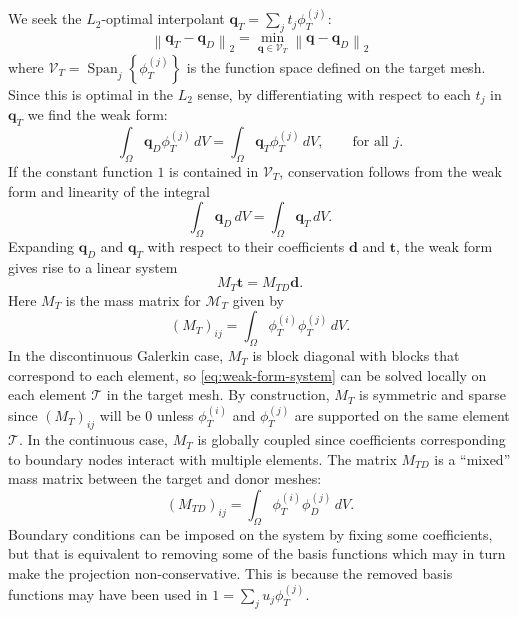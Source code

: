 \documentclass[oneside, reqno]{amsart}
\theoremstyle{definition}
\begin{document}
We seek the \(L_2\)-optimal interpolant \(\bm{q}_T = \sum_j t_j \phi_T^{(j)}\):
\begin{equation}
\left \lVert \bm{q}_T - \bm{q}_D \right \rVert_2 =
\min_{\bm{q} \in \mathcal{V}_T}
\left \lVert \bm{q} - \bm{q}_D \right \rVert_2
\end{equation}
where \(\mathcal{V}_T = \operatorname{Span}_j\left\{\phi_T^{(j)}\right\}\)
is the function space defined on the target mesh. Since this is optimal in
the \(L_2\) sense, by differentiating with respect to each \(t_j\) in
\(\bm{q}_T\) we find the weak form:
\begin{equation}
\int_{\Omega} \bm{q}_D \phi_T^{(j)} \, dV =
  \int_{\Omega} \bm{q}_T \phi_T^{(j)} \, dV, \qquad \text{for all } j.
\end{equation}
If the constant function \(1\) is contained in \(\mathcal{V}_T\),
conservation follows from the weak form and linearity of the integral
\begin{equation}
\int_{\Omega} \bm{q}_D \, dV =
  \int_{\Omega} \bm{q}_T \, dV.
\end{equation}
Expanding \(\bm{q}_D\) and \(\bm{q}_T\) with respect to their coefficients
\(\bm{d}\) and \(\bm{t}\), the weak form gives rise to a linear system
\begin{equation}\label{eq:weak-form-system}
M_T \bm{t} = M_{TD} \bm{d}.
\end{equation}
Here \(M_T\) is the mass matrix for
\(\mathcal{M}_T\) given by
\begin{equation}
\left(M_T\right)_{ij} = \int_{\Omega} \phi_T^{(i)} \phi_T^{(j)} \, dV.
\end{equation}
In the discontinuous Galerkin case, \(M_T\) is block diagonal with blocks
that correspond to each element, so \eqref{eq:weak-form-system} can be
solved locally on each element \(\mathcal{T}\) in the target mesh. By
construction, \(M_T\) is symmetric and sparse since \(\left(M_T\right)_{ij}\)
will be \(0\) unless \(\phi_T^{(i)}\) and \(\phi_T^{(j)}\) are supported
on the same element \(\mathcal{T}\). In the continuous case, \(M_T\) is
globally coupled since coefficients corresponding to boundary nodes interact
with multiple elements. The matrix \(M_{TD}\) is a ``mixed'' mass matrix
between the target and donor meshes:
\begin{equation}
\left(M_{TD}\right)_{ij} = \int_{\Omega} \phi_T^{(i)} \phi_D^{(j)} \, dV.
\end{equation}
Boundary conditions can be imposed on the system by fixing some coefficients,
but that is equivalent to removing some of the basis functions which may
in turn make the projection non-conservative. This is because the removed
basis functions may have been used in \(1 = \sum_j u_j \phi_{T}^{(j)}\).
\end{document}
